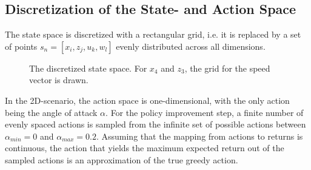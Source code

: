 \subsection{Discretization of the State- and Action Space}
\label{sec:disc2d}
The state space is discretized with a rectangular grid, i.e. it is replaced by a set of points $s_n=[x_i,z_j,u_k,w_l]$ evenly distributed across all dimensions.

\begin{figure}
	\centering
	\caption{The discretized state space. For $x_4$ and $z_3$, the grid for the speed vector is drawn.}
	\label{tikz:2d_state_space_discretized}
\end{figure}

In the 2D-scenario, the action space is one-dimensional, with the only action being the angle of attack $\alpha$. For the policy improvement step, a finite number of evenly spaced actions is sampled from the infinite set of possible actions between $\alpha_{min} = 0$ and $\alpha_{max}=0.2$. Assuming that the mapping from actions to returns is continuous, the action that yields the maximum expected return out of the sampled actions is an approximation of the true greedy action.


